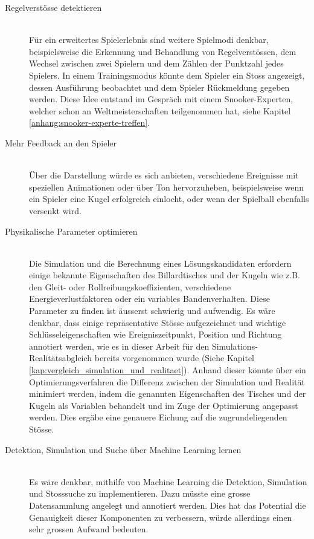 \begin{description}
    \item[Regelverstösse detektieren]\mbox{} \\
    Für ein erweitertes Spielerlebnis sind weitere Spielmodi denkbar, beispielsweise die Erkennung und Behandlung von
    Regelverstössen, dem Wechsel zwischen zwei Spielern und dem Zählen der Punktzahl jedes Spielers.
    In einem Trainingsmodus könnte dem Spieler ein Stoss angezeigt, dessen Ausführung beobachtet und dem Spieler
    Rückmeldung gegeben werden.
    Diese Idee entstand im Gespräch mit einem Snooker-Experten, welcher schon an Weltmeisterschaften teilgenommen hat, siehe Kapitel \ref{anhang:snooker-experte-treffen}.
    \item[Mehr Feedback an den Spieler]\mbox{} \\
    Über die Darstellung würde es sich anbieten, verschiedene Ereignisse mit speziellen Animationen oder über Ton hervorzuheben,
    beispielsweise wenn ein Spieler eine Kugel erfolgreich einlocht, oder wenn der Spielball ebenfalls versenkt wird.
    \item[Physikalische Parameter optimieren]\mbox{} \\
    Die Simulation und die Berechnung eines Lösungskandidaten erfordern einige bekannte Eigenschaften des Billardtisches und
    der Kugeln wie z.B. den Gleit- oder Rollreibungskoeffizienten, verschiedene Energieverlustfaktoren oder ein variables
    Bandenverhalten. Diese Parameter zu finden ist äusserst schwierig und aufwendig. Es wäre denkbar, dass einige repräsentative
    Stösse aufgezeichnet und wichtige Schlüsseleigenschaften wie Ereigniszeitpunkt, Position und Richtung annotiert werden,
    wie es in dieser Arbeit für den Simulations- Realitätsabgleich bereits vorgenommen
    wurde (Siehe Kapitel \ref{kap:vergleich_simulation_und_realitaet}). Anhand dieser könnte über ein Optimierungsverfahren
    die Differenz zwischen der Simulation und Realität minimiert werden, indem die genannten Eigenschaften des Tisches und
    der Kugeln als Variablen behandelt und im Zuge der Optimierung angepasst werden. Dies ergäbe eine genauere Eichung auf
    die zugrundeliegenden Stösse.
    \item[Detektion, Simulation und Suche über Machine Learning lernen]\mbox{} \\
    Es wäre denkbar, mithilfe von Machine Learning die Detektion, Simulation und Stosssuche zu implementieren.
    Dazu müsste eine grosse Datensammlung angelegt und annotiert werden.
    Dies hat das Potential die Genauigkeit dieser Komponenten zu verbessern, würde allerdings einen sehr grossen Aufwand bedeuten.
\end{description}

